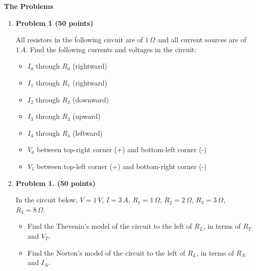 {\bf The Problems}
\begin{enumerate}

\item {\bf Problem 1 (50 points)}

  All resistors in the following circuit are of $1\,\Omega$
  and all current sources are of $1\,A$. Find the following
  currents and voltages in the circuit:
  \begin{itemize}
  \item $I_0$ through $R_0$ (rightward)
  \item $I_1$ through $R_1$ (rightward)
  \item $I_2$ through $R_2$ (downward)
  \item $I_3$ through $R_3$ (upward)
  \item $I_4$ through $R_4$ (leftward)
  \item $V_0$ between top-right corner (+) and bottom-left corner (-)    
  \item $V_1$ between top-left corner (+) and bottom-right corner (-)    
  \end{itemize}


  \begin{comment}
  {\bf Solution:}  Convert all three non-ideal current sources
  into non-ideal voltage sources of $1\;V$ in series with $1\,\Omega$
  resistors, find the total current through this loop 
  $I_1=(1+1-1)/(1+1+1+1)=1/4\,A$, 
  \begin{itemize}
  \item $I_0=1\;A$
  \item $I_1=1/4\;A$
  \item $I_2=3/4\;A$
  \item $I_3=5/4\;A$
  \item $I_4=3/4\;A$
  \item $V_0=1/2$
  \item $V_1=1+3/4=7/4$
  \end{itemize}
  \end{comment}
  

\item {\bf Problem 1. (50 points)} 

  In the circuit below, $V=1\,V$, $I=3\,A$, $R_1=1\,\Omega$,
  $R_2=2\,\Omega$, $R_3=3\,\Omega$, $R_4=8\,\Omega$. 


  \begin{itemize}
  \item Find the Thevenin's model of the circuit to the left of 
    $R_L$, in terms of $R_T$ and $V_T$.
  \item Find the Norton's model of the circuit to the left of 
    $R_L$, in terms of $R_N$ and $I_N$.
  \end{itemize}


\end{enumerate}
